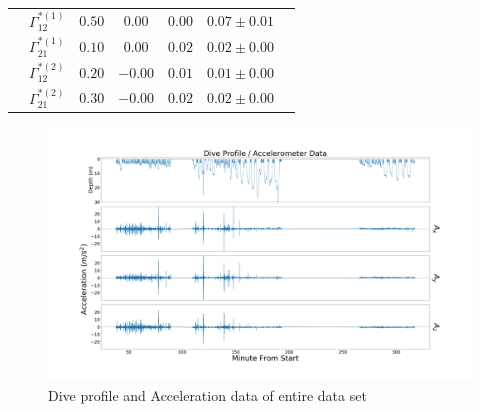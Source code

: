 \begin{table}[t]
{\begin{tabular}{ccccccc}
                             & $\Gamma^{*(1)}_{12}$          & $0.50$                         & $0.00$                   & $0.00$                           & $0.07 \pm 0.01$                             \\
                             & $\Gamma^{*(1)}_{21}$          & $0.10$                         & $0.00$                   & $0.02$                           & $0.02 \pm 0.00$                             \\
                             & $\Gamma^{*(2)}_{12}$          & $0.20$                         & $-0.00$                   & $0.01$                           & $0.01 \pm 0.00$                             \\
                             & $\Gamma^{*(2)}_{21}$          & $0.30$                         & $-0.00$                   & $0.02$                           & $0.02 \pm 0.00$                             \\ \hline

\end{tabular}
}
\label{table:Gamma}
\end{table}


\begin{figure}[ht]
	\centering
	\includegraphics[width=5in]{../Plots/raw_data.png}
	\caption{Dive profile and Acceleration data of entire data set}
	\label{fig:data}
\end{figure}

